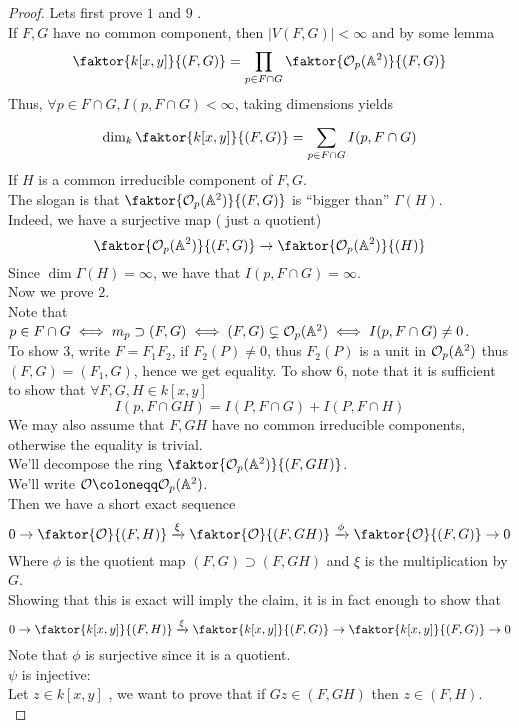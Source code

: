 \documentclass[../main.tex]{subfiles}
\begin{document}
\begin{proof}
Lets first prove $1$ and $9$ .\\
If $F,G$ have no common component, then $|V( F,G) | < \infty $ and by some lemma
\[ 
	\faktor{k[x,y]}{ ( F,G) }= \prod_{p\in F\cap G} \faktor{ \O_p( \mathbb{A}^{2}) }{( F,G) }
\]
Thus, $\forall p\in F\cap G, I( p,F\cap G) < \infty $, taking dimensions yields
\[ 
	\dim_k \faktor{ k[x,y]}{( F,G) } = \sum_{p\in F\cap G}^{ } I( p,F\cap G) 
\]
If $H$ is a common irreducible component of $F,G$.\\
The slogan is that $ \faktor{\O_p( \mathbb{A}^{2}) }{( F,G) }$ is ``bigger than'' $\Gamma( H) $.\\
Indeed, we have a surjective map ( just a quotient) 
\[ 
\faktor{\O_p( \mathbb{A}^{2}) }{( F,G) } \to \faktor{\O_p( \mathbb{A}^{2}) }{( H) }
\]
Since $\dim \Gamma( H) = \infty $, we have that $I( p,F\cap G) = \infty $.\\
Now we prove $2$.\\
Note that $p\in F\cap G \iff  m_p \supset ( F,G) \iff ( F,G) \subsetneq \mathcal{O}_p( \mathbb{A}^{2}) \iff I( p, F\cap G) \neq 0$.\\
To show $3$, write $F= F_1F_2$, if $F_2( P) \neq 0$, thus $F_2( P) $ is a unit in $\mathcal{O}_p( \mathbb{A}^{2}) $ thus $( F,G) = ( F_1,G) $, hence we get equality.
To show $6$, note that it is sufficient to show that $\forall F,G,H\in k[x,y]$
\[ 
I( p,F\cap GH) = I( P,F\cap G) + I( P,F\cap H) 
\]
We may also assume that $F,GH$ have no common irreducible components, otherwise the equality is trivial.\\
We'll decompose the ring $ \faktor{ \O_p( \mathbb{A}^{2}) }{ ( F,GH) }$.\\
We'll write $\O \coloneqq \O_p( \mathbb{A}^{2}) $.\\
Then we have a short exact sequence
\[ 
	0\to \faktor{\O}{( F,H) }\xrightarrow{\xi} \faktor{\O}{( F,GH) }\xrightarrow{\phi} \faktor{\O}{( F,G) }\to 0
\]
Where $\phi$ is the quotient map $( F,G) \supset ( F,GH) $ and $\xi$ is the multiplication by $G$.\\
Showing that this is exact will imply the claim, it is in fact enough to show that
\[ 
	0 \to \faktor{k[x,y]}{( F,H) }\xrightarrow{\xi} \faktor{k[x,y]}{( F,G) }\to \faktor{k[x,y]}{( F,G) }\to 0
\]
Note that $\phi$ is surjective since it is a quotient.\\
$\psi$ is injective:\\
Let $z\in k[x,y]$ , we want to prove that if $Gz \in ( F,GH) $ then $z\in ( F,H) $.\\

\end{proof}
\end{document}
